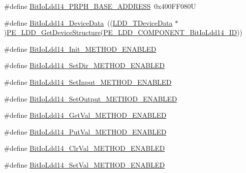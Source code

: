 \begin{DoxyCompactItemize}
\item 
\#define \hyperlink{group___bit_io_ldd14__module_ga174d2e94a3705f805c53da772b71aa19}{Bit\+Io\+Ldd14\+\_\+\+P\+R\+P\+H\+\_\+\+B\+A\+S\+E\+\_\+\+A\+D\+D\+R\+E\+SS}~0x400\+F\+F080U
\item 
\#define \hyperlink{group___bit_io_ldd14__module_ga73f5611a097a03f5f36a403f6b6e9fff}{Bit\+Io\+Ldd14\+\_\+\+Device\+Data}~((\hyperlink{group___p_e___types__module_gac5cf1362f1f0e3a2ce71b1bf2276d091}{L\+D\+D\+\_\+\+T\+Device\+Data} $\ast$)\hyperlink{group___p_e___types__module_gaa1c23d559daef5bcd3327ca83fb56f5a}{P\+E\+\_\+\+L\+D\+D\+\_\+\+Get\+Device\+Structure}(\hyperlink{group___p_e___types__module_ga7cc66dfdbf7f867cc668d41014fb59bd}{P\+E\+\_\+\+L\+D\+D\+\_\+\+C\+O\+M\+P\+O\+N\+E\+N\+T\+\_\+\+Bit\+Io\+Ldd14\+\_\+\+ID}))
\item 
\#define \hyperlink{group___bit_io_ldd14__module_ga0ea5aa83cdae59e924508c64058deb8d}{Bit\+Io\+Ldd14\+\_\+\+Init\+\_\+\+M\+E\+T\+H\+O\+D\+\_\+\+E\+N\+A\+B\+L\+ED}
\item 
\#define \hyperlink{group___bit_io_ldd14__module_gaad97bb1ed916d9f1b93f0e04fd1cc629}{Bit\+Io\+Ldd14\+\_\+\+Set\+Dir\+\_\+\+M\+E\+T\+H\+O\+D\+\_\+\+E\+N\+A\+B\+L\+ED}
\item 
\#define \hyperlink{group___bit_io_ldd14__module_ga0114f48b7fe55bc3c19c0beafc594a18}{Bit\+Io\+Ldd14\+\_\+\+Set\+Input\+\_\+\+M\+E\+T\+H\+O\+D\+\_\+\+E\+N\+A\+B\+L\+ED}
\item 
\#define \hyperlink{group___bit_io_ldd14__module_ga729b2e2c5b9c0e78693d8b7c96b7bf28}{Bit\+Io\+Ldd14\+\_\+\+Set\+Output\+\_\+\+M\+E\+T\+H\+O\+D\+\_\+\+E\+N\+A\+B\+L\+ED}
\item 
\#define \hyperlink{group___bit_io_ldd14__module_ga6b751bf79578d7570151771c1e359b06}{Bit\+Io\+Ldd14\+\_\+\+Get\+Val\+\_\+\+M\+E\+T\+H\+O\+D\+\_\+\+E\+N\+A\+B\+L\+ED}
\item 
\#define \hyperlink{group___bit_io_ldd14__module_ga7e501352cbbdd906c1cdd0e395738c7c}{Bit\+Io\+Ldd14\+\_\+\+Put\+Val\+\_\+\+M\+E\+T\+H\+O\+D\+\_\+\+E\+N\+A\+B\+L\+ED}
\item 
\#define \hyperlink{group___bit_io_ldd14__module_gad74c853d742fa900778165681499a132}{Bit\+Io\+Ldd14\+\_\+\+Clr\+Val\+\_\+\+M\+E\+T\+H\+O\+D\+\_\+\+E\+N\+A\+B\+L\+ED}
\item 
\#define \hyperlink{group___bit_io_ldd14__module_gaec4d1743931523cfa84384fea9affe1a}{Bit\+Io\+Ldd14\+\_\+\+Set\+Val\+\_\+\+M\+E\+T\+H\+O\+D\+\_\+\+E\+N\+A\+B\+L\+ED}
\item 

\end{DoxyCompactItemize}

